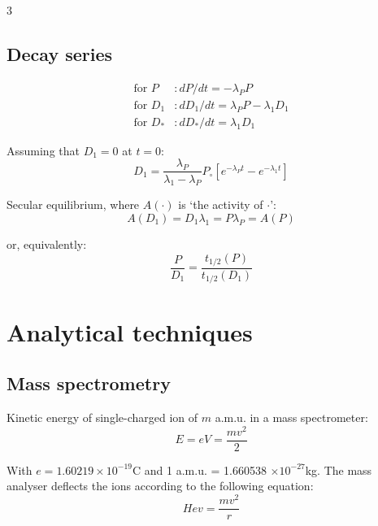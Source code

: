 \documentclass{article}
\begin{document}
\begin{multicols}{3}
\subsection{Decay series}
\label{sec:decay-series}

\begin{align}
\mbox{for~} P &: dP/dt = -\lambda_P P \label{eq:P1}\\
\mbox{for~} D_1 &: dD_1/dt = \lambda_P P - \lambda_1 D_1 \label{eq:D1}\\
\mbox{for~} D_* &: dD_*/dt = \lambda_1 D_1 \label{eq:D*}
\end{align}

Assuming that $D_1=0$ at $t=0$:
\begin{equation}
D_1 = \frac{\lambda_P}{\lambda_1 - \lambda_P} P_\circ \left[
  e^{-\lambda_P t} - e^{-\lambda_1 t}\right]
\label{eq:ND1}
\end{equation}

Secular equilibrium, where $A(\cdot)$ is `the activity of $\cdot$':
\begin{equation}
A(D_1) = D_1 \lambda_1 = P \lambda_P = A(P)
\label{eq:ND1L1}
\end{equation}

or, equivalently:
\begin{equation}
\frac{P}{D_1} = \frac{t_{1/2}(P)}{t_{1/2}(D_1)}
\label{eq:NPND1}
\end{equation}

\section{Analytical techniques}
\label{ch:analyticaltechniques}

\subsection{Mass spectrometry}
\label{sec:mass-specs}

Kinetic energy of single-charged ion of $m$ a.m.u. in a mass
spectrometer:
\begin{equation}
E = e V = \frac{m v^2}{2}
\label{eq:E}
\end{equation}

With $e = 1.60219 \times 10^{-19}$C and 1 a.m.u. = 1.660538 $\times
10^{-27}$kg. The mass analyser deflects the ions according to the
following equation:
\begin{equation}
H e v = \frac{m v^2}{r}
\label{eq:Hev}
\end{equation}


\end{multicols}
\end{document}
